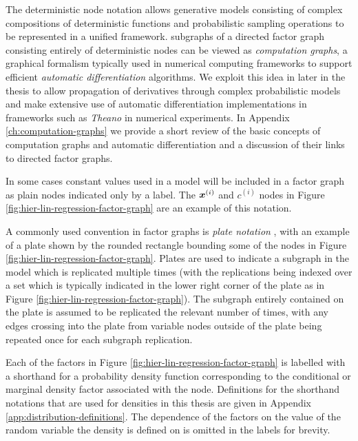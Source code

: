 The deterministic node notation allows generative models consisting of complex compositions of deterministic functions and probabilistic sampling operations to be represented in a unified framework. subgraphs of a directed factor graph consisting entirely of deterministic nodes can be viewed as \emph{computation graphs}, a graphical formalism typically used in numerical computing frameworks to support efficient \emph{automatic differentiation} algorithms. We exploit this idea in later in the thesis to allow propagation of derivatives through complex probabilistic models and make extensive use of automatic differentiation implementations in frameworks such as \emph{Theano} \citep{theano2016theano} in numerical experiments. In Appendix \ref{ch:computation-graphs} we provide a short review of the basic concepts of computation graphs and automatic differentiation and a discussion of their links to directed factor graphs.

In some cases constant values used in a model will be included in a factor graph as plain nodes indicated only by a label. The $\boldsymbol{x}^{(i)}$ and $c^{(i)}$ nodes in Figure \ref{fig:hier-lin-regression-factor-graph} are an example of this notation.

A commonly used convention in factor graphs is \emph{plate notation} \citep{buntine1994operations}, with an example of a plate shown by the rounded rectangle bounding some of the nodes in Figure \ref{fig:hier-lin-regression-factor-graph}. Plates are used to indicate a subgraph in the model which is replicated multiple times (with the replications being indexed over a set which is typically indicated in the lower right corner of the plate as in Figure \ref{fig:hier-lin-regression-factor-graph}). The subgraph entirely contained on the plate is assumed to be replicated the relevant number of times, with any edges crossing into the plate from variable nodes outside of the plate being repeated once for each subgraph replication. %

Each of the factors in Figure \ref{fig:hier-lin-regression-factor-graph} is labelled with a shorthand for a probability density function corresponding to the conditional or marginal density factor associated with the node. Definitions for the shorthand notations that are used for densities in this thesis are given in Appendix \ref{app:distribution-definitions}. The dependence of the factors on the value of the random variable the density is defined on is omitted in the labels for brevity.

